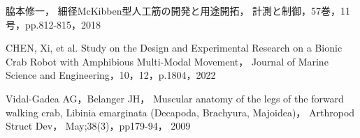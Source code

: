 \documentclass{jarticle}
\begin{document}
\begin{thebibliography}{99}

  脇本修一，
  細径McKibben型人工筋の開発と用途開拓，
  計測と制御，57巻，11号，pp.812-815，2018
  
  CHEN, Xi, et al. Study on the Design and Experimental Research on a Bionic Crab Robot with Amphibious Multi-Modal Movement， Journal of Marine Science and Engineering，10，12，p.1804，2022
  
  Vidal-Gadea AG，Belanger JH， Muscular anatomy of the legs of the forward walking crab, Libinia emarginata (Decapoda, Brachyura, Majoidea)， Arthropod Struct Dev， May;38(3)，pp179-94， 2009
  
  
  
 \end{thebibliography}
\end{document}
